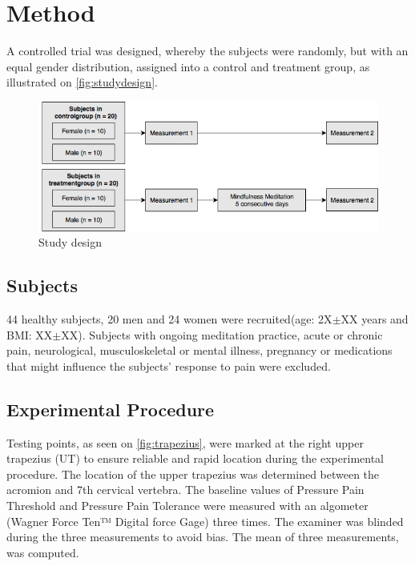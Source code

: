 \section{Method}
A controlled trial was designed, whereby the subjects were randomly, but with an equal gender distribution, assigned into a control and treatment group, as illustrated on \autoref{fig:studydesign}.
\begin{figure}[H]
\centering
\includegraphics[width=1\columnwidth]{../figures/studydesign.png}
\caption{Study design}
\label{fig:studydesign}
\end{figure} \vspace{-.5cm}


\subsection{Subjects}
44 healthy subjects, 20 men and 24 women were recruited(age: 2X$\pm$XX years and BMI: XX$\pm$XX). 
Subjects with ongoing meditation practice, acute or chronic pain, neurological, musculoskeletal or mental illness, pregnancy or medications that might influence the subjects’ response to pain were excluded.

\subsection{Experimental Procedure}
Testing points, as seen on \autoref{fig:trapezius}, were marked at the right upper trapezius (UT) to ensure reliable and rapid location during the experimental procedure. The location of the upper trapezius was determined between the acromion and 7th cervical vertebra. The baseline values of Pressure Pain Threshold and Pressure Pain Tolerance were measured with an algometer (Wagner Force Ten™ Digital force Gage) three times. The examiner was blinded during the three measurements to avoid bias. The mean of three measurements, was computed. 

